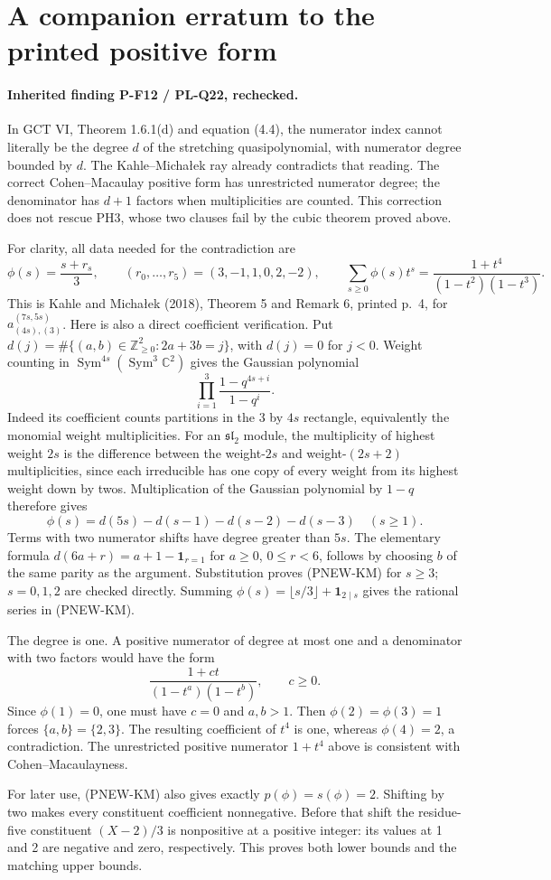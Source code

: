\section{A companion erratum to the printed positive form}
\label{sec:positive-form-erratum}

\paragraph{Inherited finding P-F12 / PL-Q22, rechecked.}
In GCT VI, Theorem 1.6.1(d) and equation (4.4), the numerator
index cannot literally be the degree $d$ of the stretching
quasipolynomial, with numerator degree bounded by $d$.
The Kahle--Micha\l ek ray already contradicts that reading.
The correct Cohen--Macaulay positive form has unrestricted
numerator degree; the denominator has $d+1$ factors when
multiplicities are counted.  This correction does not rescue
PH3, whose two clauses fail by the cubic theorem proved above.

For clarity, all data needed for the contradiction are
\[
 \phi(s)=\frac{s+r_s}{3},\qquad
 (r_0,\ldots,r_5)=(3,-1,1,0,2,-2),\qquad
 \sum_{s\ge0}\phi(s)t^s=\frac{1+t^4}{(1-t^2)(1-t^3)}.
 \tag{PNEW-KM}
\]
This is Kahle and Micha\l ek (2018), Theorem 5 and Remark 6,
printed p.~4, for $a_{(4s),(3)}^{(7s,5s)}$.
Here is also a direct coefficient verification.  Put
$d(j)=\#\{(a,b)\in\mathbb Z_{\ge0}^2:2a+3b=j\}$,
with $d(j)=0$ for $j<0$.  Weight counting in
$\operatorname{Sym}^{4s}(\operatorname{Sym}^3\mathbb C^2)$
gives the Gaussian polynomial
\[
 \prod_{i=1}^3\frac{1-q^{4s+i}}{1-q^i}.
\]
Indeed its coefficient counts partitions in the $3$ by $4s$
rectangle, equivalently the monomial weight multiplicities.
For an $\mathfrak{sl}_2$ module, the multiplicity of highest
weight $2s$ is the difference between the weight-$2s$ and
weight-$(2s+2)$ multiplicities, since each irreducible has
one copy of every weight from its highest weight down by twos.
Multiplication of the Gaussian polynomial by $1-q$ therefore
gives
\[
 \phi(s)=d(5s)-d(s-1)-d(s-2)-d(s-3)\quad(s\ge1).
\]
Terms with two numerator shifts have degree greater than $5s$.
The elementary formula
$d(6a+r)=a+1-\mathbf1_{r=1}$ for $a\ge0$, $0\le r<6$,
follows by choosing $b$ of the same parity as the argument.
Substitution proves (PNEW-KM) for $s\ge3$; $s=0,1,2$
are checked directly.  Summing
$\phi(s)=\lfloor s/3\rfloor+\mathbf1_{2\mid s}$ gives
the rational series in (PNEW-KM).

The degree is one.  A positive numerator of degree at most one
and a denominator with two factors would have the form
\[
                \frac{1+ct}{(1-t^a)(1-t^b)},\qquad c\ge0.
\]
Since $\phi(1)=0$, one must have $c=0$ and $a,b>1$.
Then $\phi(2)=\phi(3)=1$ forces $\{a,b\}=\{2,3\}$.
The resulting coefficient of $t^4$ is one, whereas
$\phi(4)=2$, a contradiction.  The unrestricted positive
numerator $1+t^4$ above is consistent with
Cohen--Macaulayness.

For later use, (PNEW-KM) also gives exactly
$p(\phi)=s(\phi)=2$.  Shifting by two makes every constituent
coefficient nonnegative.  Before that shift the residue-five
constituent $(X-2)/3$ is nonpositive at a positive integer:
its values at 1 and 2 are negative and zero, respectively.
This proves both lower bounds and the matching upper bounds.
